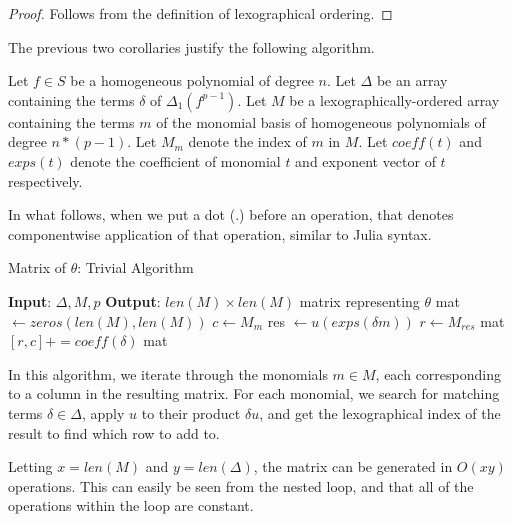 \begin{proof}
	Follows from the definition of lexographical
	ordering.
\end{proof}

The previous two corollaries justify
the following algorithm.

\begin{cxt}
	Let \(f \in S\) be a homogeneous
	polynomial of degree \(n\).
	Let \(\Delta\) be an array containing the 
	terms $\delta$ of \(\Delta_{1}(f^{p-1})\).
	Let \(M\) be a lexographically-ordered array containing the terms $m$ of the monomial basis of
	homogeneous polynomials of degree
	\(n*(p-1)\). Let $M_m$ denote the index of $m$ in $M$. Let $coeff(t)$ and $exps(t)$ denote the coefficient of monomial $t$ and exponent vector of $t$ respectively.
\end{cxt}

In what follows, when we put a dot (\(.\))
before an operation, that denotes
componentwise application
of that operation, similar to Julia syntax.

\begin{algorithm}[H]
    \caption{Matrix of $\theta$: Trivial Algorithm}
    \label{alg:matrix:trivial}
    \begin{algorithmic}[1]
    \State \textbf{Input}: $\Delta, M, p$
    \State \textbf{Output}: $len(M) \times len(M)$ matrix representing $\theta$
    \State mat $\gets zeros(len(M), len(M))$
        \State $c \gets M_{m}$
        \For{$\delta \in \Delta$}
             
                \State res $\gets u(exps(\delta m))$
                \State $r \gets M_{res}$
                \State mat $[r, c] += coeff(\delta)$
            \EndIf
        \EndFor
    \EndFor
    \State \Return mat
    \end{algorithmic}
\end{algorithm}

In this algorithm, we iterate through the monomials $m \in M$, each corresponding to a column in the
resulting matrix. For each monomial, we search for matching terms $\delta \in \Delta$, apply $u$ to their product $\delta u$, and 
get the lexographical index of the result to find which row to add to.

Letting $x = len(M)$ and $y = len(\Delta)$, the matrix can be generated in $O(xy)$ operations. This can easily be
seen from the nested loop, and that all of the operations within the loop are constant.

